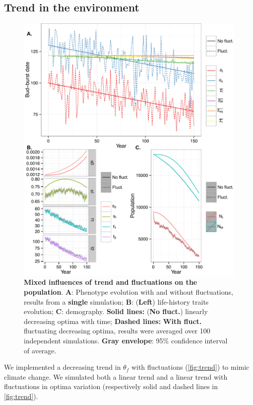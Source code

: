 \subsection*{Trend in the environment}

\begin{figure}[ht!]
	\centering
	\includegraphics[scale=1]{Figures/Trend.pdf}
	\caption{\textbf{Mixed influences of trend and fluctuations on the population}. \textbf{A}: Phenotype evolution with and without fluctuations, results from a \textbf{single} simulation; \textbf{B}: (\textbf{Left}) life-history traits evolution; \textbf{C}: demography. \textbf{Solid lines:} (\textbf{No fluct.}) linearly decreasing optima with time; \textbf{Dashed lines:} \textbf{With fluct.} fluctuating decreasing optima, results were averaged over 100 independent simulations. \textbf{Gray envelope}: 95\% confidence interval of average.}
	\label{fig:trend}
\end{figure}

We implemented a decreasing trend in $\theta_f$ with fluctuations (\autoref{fig:trend}) to mimic climate change. We simulated both a linear trend and a linear trend with fluctuations in optima variation (respectively solid and dashed lines in \autoref{fig:trend}).

